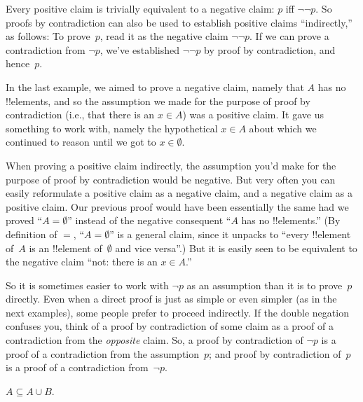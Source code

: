 \documentclass[../../../include/open-logic-section]{subfiles}
\begin{document}
Every positive claim is trivially equivalent to a negative claim: $p$
iff $\lnot\lnot p$.  So proofs by contradiction can also be used to
establish positive claims ``indirectly,'' as follows: To prove~$p$,
read it as the negative claim $\lnot\lnot p$. If we can prove a
contradiction from $\lnot p$, we've established $\lnot\lnot p$ by
proof by contradiction, and hence~$p$.

In the last example, we aimed to prove a negative claim, namely that
$A$ has no !!{element}s, and so the assumption we made for the purpose
of proof by contradiction (i.e., that there is an $x \in A$) was a
positive claim. It gave us something to work with, namely the
hypothetical $x \in A$ about which we continued to reason until we got
to $x \in \emptyset$.

When proving a positive claim indirectly, the assumption you'd make
for the purpose of proof by contradiction would be negative. But very
often you can easily reformulate a positive claim as a negative claim,
and a negative claim as a positive claim.  Our previous proof would
have been essentially the same had we proved ``$A = \emptyset$''
instead of the negative consequent ``$A$ has no !!{element}s.'' (By
definition of $=$, ``$A = \emptyset$'' is a general claim, since it
unpacks to ``every !!{element} of~$A$ is an !!{element} of~$\emptyset$
and vice versa''.) But it is easily seen to be equivalent to the
negative claim ``not: there is an $x \in A$.''

So it is sometimes easier to work with $\lnot p$ as an assumption than
it is to prove~$p$ directly.  Even when a direct proof is just as
simple or even simpler (as in the next examples), some people prefer to
proceed indirectly.  If the double negation confuses you, think of a
proof by contradiction of some claim as a proof of a contradiction
from the \emph{opposite} claim. So, a proof by contradiction of $\lnot
p$ is a proof of a contradiction from the assumption~$p$; and proof by
contradiction of~$p$ is a proof of a contradiction from~$\lnot p$.

\begin{prop}
$A \subseteq A \cup B$.
\end{prop}
\end{document}
